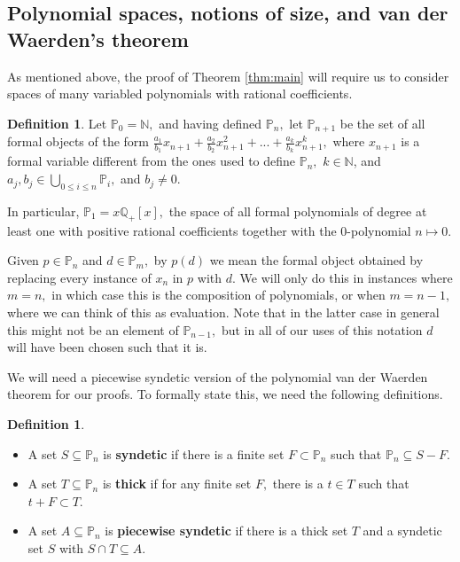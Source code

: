 \documentclass[10pt,a4paper]{article}
\theoremstyle{definition}
\newtheorem{definition}[theorem]{Definition}
\begin{document}
\subsection{Polynomial spaces, notions of size, and van der Waerden's theorem}\label{subsection poly}

As mentioned above, the proof of Theorem \ref{thm:main} will require us to consider spaces of many variabled polynomials with rational coefficients.

\begin{definition}
Let $\mathbb{P}_0=\mathbb{N},$ and having defined $\mathbb{P}_n,$ let $\mathbb{P}_{n+1}$ be the set of all formal objects of the form $\frac{a_1}{b_1}x_{n+1}+\frac{a_2}{b_2}x_{n+1}^2+...+\frac{a_k}{b_k}x_{n+1}^k,$ where $x_{n+1}$ is a formal variable different from the ones used to define $\mathbb{P}_n,$ $k\in\mathbb{N}$, and $a_j,b_j\in \bigcup_{0\leq i\leq n} \mathbb{P}_i,$ and $b_j\neq 0.$ 
\end{definition}


In particular, $\mathbb{P}_1=x\mathbb{Q}_+[x],$ the space of all formal polynomials of degree at least one with positive rational coefficients together with the $0$-polynomial $n\mapsto 0$. 

Given $p\in \mathbb{P}_{n}$ and $d\in\mathbb{P}_m,$ by $p(d)$ we mean the formal object obtained by replacing every instance of $x_{n}$ in $p$ with $d.$  We will only do this in instances where $m=n,$ in which case this is the composition of polynomials, or when $m=n-1,$ where we can think of this as evaluation.  Note that in the latter case in general this might not be an element of $\mathbb{P}_{n-1},$ but in all of our uses of this notation $d$ will have been chosen such that it is.

We will need a piecewise syndetic version of the polynomial van der Waerden theorem for our proofs. To formally state this, we need the following definitions.  


\begin{definition}
\hspace{3mm}
\begin{itemize}
    \item A set $S\subseteq \mathbb{P}_n$ is \textbf{syndetic} if there is a finite set $F\subset\mathbb{P}_n$ such that $\mathbb{P}_n\subseteq S-F.$
    
    \item A set $T\subseteq\mathbb{P}_n$ is \textbf{thick} if for any finite set $F,$ there is a $t\in T$ such that $t+F\subset T.$
    
    \item  A set $A\subseteq\mathbb{P}_n$ is \textbf{piecewise syndetic} if there is a thick set $T$ and a syndetic set $S$ with $S\cap T\subseteq A.$
\end{itemize}
\end{definition}  
\end{document}
